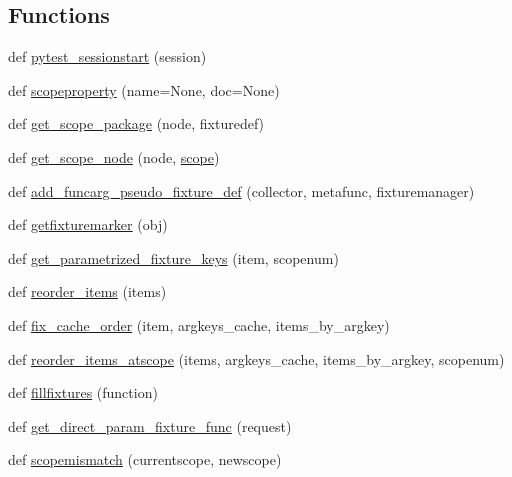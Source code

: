 \subsection*{Functions}
\begin{DoxyCompactItemize}
\item 
def \hyperlink{namespace__pytest_1_1fixtures_a995865f09bb645c7a5bcfdcb11e2c154}{pytest\+\_\+sessionstart} (session)
\item 
def \hyperlink{namespace__pytest_1_1fixtures_a1b3d6eac66174544e16dfd62cc0f77fa}{scopeproperty} (name=None, doc=None)
\item 
def \hyperlink{namespace__pytest_1_1fixtures_ae4cdf7af597ce69288c82a6dd57bcb6b}{get\+\_\+scope\+\_\+package} (node, fixturedef)
\item 
def \hyperlink{namespace__pytest_1_1fixtures_a214e840e7e5ebbe2333e4880664a148f}{get\+\_\+scope\+\_\+node} (node, \hyperlink{namespace__pytest_1_1fixtures_a13dd74c58426e1e7d1f13069b3caffee}{scope})
\item 
def \hyperlink{namespace__pytest_1_1fixtures_af889cb5dc2338f176beed2d20c138fb0}{add\+\_\+funcarg\+\_\+pseudo\+\_\+fixture\+\_\+def} (collector, metafunc, fixturemanager)
\item 
def \hyperlink{namespace__pytest_1_1fixtures_acf7e1a776f0cacd5616d771b8f7d84f7}{getfixturemarker} (obj)
\item 
def \hyperlink{namespace__pytest_1_1fixtures_a726d8a513109c1b11172bf9dc9a6608b}{get\+\_\+parametrized\+\_\+fixture\+\_\+keys} (item, scopenum)
\item 
def \hyperlink{namespace__pytest_1_1fixtures_abc92ba4fd6b080bb8f11cbcef4aeafe0}{reorder\+\_\+items} (items)
\item 
def \hyperlink{namespace__pytest_1_1fixtures_a90425ae7b8fd46e6cd3b3f56b53c07a5}{fix\+\_\+cache\+\_\+order} (item, argkeys\+\_\+cache, items\+\_\+by\+\_\+argkey)
\item 
def \hyperlink{namespace__pytest_1_1fixtures_a4644c7729264a65ac60b0101edb98fd7}{reorder\+\_\+items\+\_\+atscope} (items, argkeys\+\_\+cache, items\+\_\+by\+\_\+argkey, scopenum)
\item 
def \hyperlink{namespace__pytest_1_1fixtures_ab51e45645c048bd941b30a831c6de613}{fillfixtures} (function)
\item 
def \hyperlink{namespace__pytest_1_1fixtures_a774fbc96746af54bc0891207dae6d82b}{get\+\_\+direct\+\_\+param\+\_\+fixture\+\_\+func} (request)
\item 
def \hyperlink{namespace__pytest_1_1fixtures_a93accbaf2095e10285b690f2b1de6d73}{scopemismatch} (currentscope, newscope)

\end{DoxyCompactItemize}

